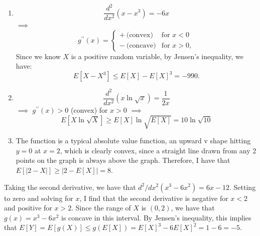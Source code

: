 \begin{problem}{25}$ $
\begin{enumerate}
\item 
\begin{equation*}
\frac{d^2}{dx^2}(x-x^3) = -6x
\end{equation*}
$\implies$ 
\[
  g^{\prime \prime}(x) =
  \begin{cases}
                                   +~\text{(convex)}& \text{for $x<0$} \\
                                   -~\text{(concave)} &  \text{for $x>0$} ,
  \end{cases}
\]
Since we know $X$ is a positive random variable, by Jensen's inequality, we have:
\begin{equation*}
E[X-X^3] \le E[X]-E[X]^3 = -990.
\end{equation*}

\item

\begin{equation*}
\frac{d^2}{dx^2}(x\ln \sqrt{x}) = \frac{1}{2x}
\end{equation*}
$\implies$ 
$ g^{\prime \prime}(x)>0$ (convex) for $x>0$
$\implies$ 
\begin{equation*}
E[X\ln \sqrt{X}] \ge E[X]\ln \sqrt{E[X]}= 10 \ln \sqrt{10}
\end{equation*}

\item  The function is a typical absolute value function, an upward v shape hitting $y=0$ at $x=2$, which is clearly convex, since a straight line drawn from any 2 points on the graph is always above the graph.  Therefore, I have that $E[|2-X|]\ge |2-E[X]| = 8.$
\end{enumerate}

\end{problem}

\begin{problem}{26} Taking the second derivative, we have that $d^2/dx^2 (x^3-6x^2) = 6x-12$.  Setting to zero and solving for $x$, I find that the second derivative is negative for $x<2$ and positive for $x>2$.  Since the range of $X$ is $(0,2)$, we have that $g(x) = x^3-6x^2$ is concave in this interval.  By Jensen's inequality, this implies that $E[Y] = E[g(X)] \le g(E[X]) = E[X]^3-6E[X]^2 = 1-6 = -5$.

\end{problem}


